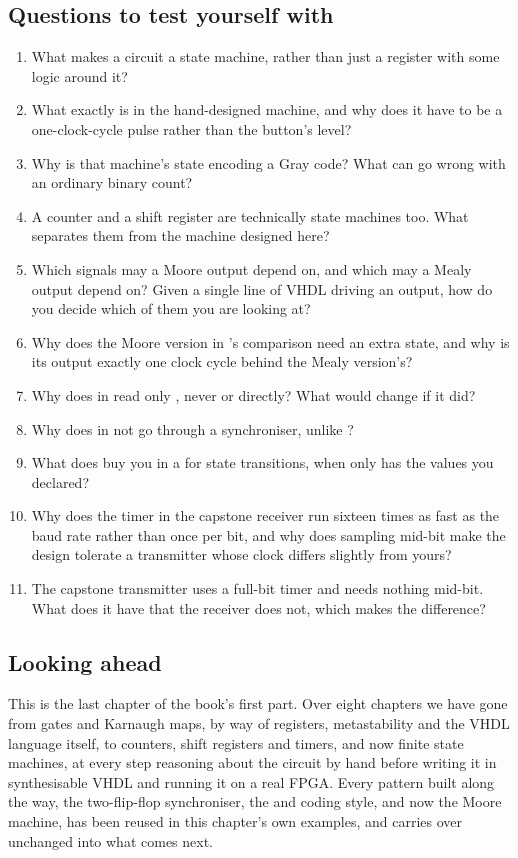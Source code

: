 \subsection*{Questions to test yourself with}
\begin{enumerate}
  \item What makes a circuit a state machine, rather than just a register with some logic around
    it?
  \item What exactly is  in the hand-designed machine, and why does it have to be a
    one-clock-cycle pulse rather than the button's level?
  \item Why is that machine's state encoding a Gray code? What can go wrong with an ordinary binary
    count?
  \item A counter and a shift register are technically state machines too. What separates them from
    the machine designed here?
  \item Which signals may a Moore output depend on, and which may a Mealy output depend on? Given a
    single line of VHDL driving an output, how do you decide which of them you are looking at?
  \item Why does the Moore version in 's comparison need an extra state, and
    why is its output exactly one clock cycle behind the Mealy version's?
  \item Why does  in  read only , never
     or  directly? What would change if it did?
  \item Why does  in  not go through a synchroniser, unlike
    ?
  \item What does  buy you in a  for state transitions, when
     only has the values you declared?
  \item Why does the timer in the capstone receiver run sixteen times as fast as the baud rate
    rather than once per bit, and why does sampling mid-bit make the design tolerate a transmitter
    whose clock differs slightly from yours?
  \item The capstone transmitter uses a full-bit timer and needs nothing mid-bit. What does it have
    that the receiver does not, which makes the difference?
\end{enumerate}

\subsection*{Looking ahead}
This is the last chapter of the book's first part. Over eight chapters we have gone from gates and
Karnaugh maps, by way of registers, metastability and the VHDL language itself, to counters, shift
registers and timers, and now finite state machines, at every step reasoning about the circuit by
hand before writing it in synthesisable VHDL and running it on a real FPGA. Every pattern built
along the way, the two-flip-flop synchroniser, the  and  coding style, and
now the Moore machine, has been reused in this chapter's own examples, and carries over unchanged
into what comes next.


